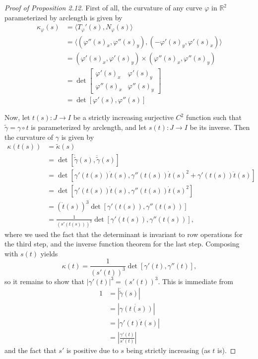 \documentclass{article}
\theoremstyle{definition}
\newcommand{\R}{\mathbb{R}}
\begin{document}
\begin{proof}[Proof of Proposition 2.12]
	First of all, the curvature of any curve $\varphi$ in $\R^2$ parameterized by
	arclength is given by
	\begin{align*}
		\kappa_{\varphi}(s)
		&=
		\langle
			T_{\varphi}'(s),
			N_{\varphi}(s)
		\rangle \\
		&=
		\langle
			(\varphi''(s)_x, \varphi''(s)_y),
			(-\varphi'(s)_y, \varphi'(s)_x)
		\rangle \\
		&=
		(\varphi'(s)_x, \varphi'(s)_y)
		\times
		(\varphi''(s)_x, \varphi''(s)_y) \\
		&= 
		\det
		\begin{bmatrix}
			\varphi'(s)_x & \varphi'(s)_y \\
			\varphi''(s)_x & \varphi''(s)_y
		\end{bmatrix} \\
		&=
		\det[\varphi'(s), \varphi''(s)]
	\end{align*}	

	Now, let $t(s) : J \to I$ be a strictly increasing surjective $C^{2}$
	function such that $\widetilde{\gamma} = \gamma \circ t$ is parameterized
	by arclength, and let $s(t) : J \to I$ be its inverse. Then the curvature
	of $\gamma$ is given by
	\begin{align*}
		\kappa(t(s))
		&=
		\widetilde{\kappa}(s) \\
		&=
		\det[\dot{\widetilde{\gamma}}(s), \ddot{\widetilde{\gamma}}(s)] \\
		&=
		\det[\gamma'(t(s)) \dot{t}(s), \gamma''(t(s)) \dot{t}(s)^2 + \gamma'(t(s))\ddot{t}(s)] \\
		&=
		\det[\gamma'(t(s)) \dot{t}(s), \gamma''(t(s)) \dot{t}(s)^2] \\
		&=
		(\dot{t}(s))^3\det[\gamma'(t(s)), \gamma''(t(s))] \\
		&=
		\frac{1}{(s'(t(s)))^3}\det[\gamma'(t(s)), \gamma''(t(s))],
	\end{align*}
	where we used the fact that the determinant is invariant to row operations
	for the third step, and the inverse function theorem for the last step.
	Composing with $s(t)$ yields
	\[
		\kappa(t)
		=
		\frac{1}{(s'(t))^3}\det[\gamma'(t), \gamma''(t)],
	\] 
	so it remains to show that $|\gamma'(t)|^{3} = (s'(t))^3$. This is
	immediate from
	\begin{align*}
		1
		&=
		|\dot{\widetilde{\gamma}}(s)| \\
		&=
		|\dot{\gamma(t(s))}| \\
		&=
		|\gamma'(t)\dot{t}(s)| \\
		&=
		\left|\frac{\gamma'(t)}{s'(t)}\right|
	\end{align*}
	and the fact that $s'$ is positive due to $s$ being strictly increasing (as
	$t$ is).
\end{proof}
\end{document}
